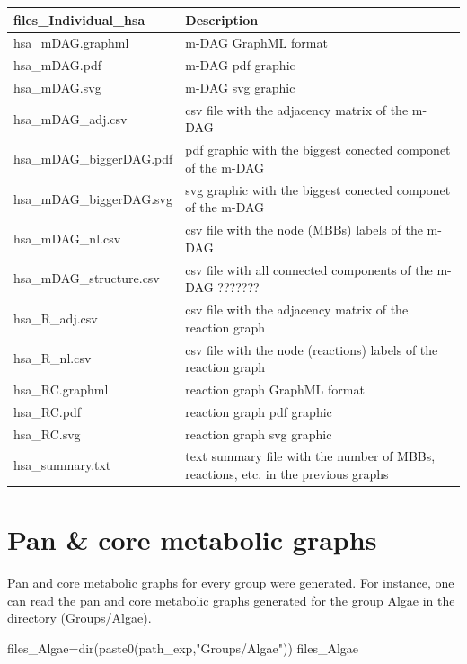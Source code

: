 \documentclass[
  letterpaper,
  DIV=11,
  numbers=noendperiod]{scrreprt}
\newenvironment{Shaded}{}{}
\newcommand{\FunctionTok}[1]{\textcolor[rgb]{0.38,0.69,0.94}{#1}}
\newcommand{\NormalTok}[1]{\textcolor[rgb]{0.67,0.70,0.75}{#1}}
\newcommand{\OtherTok}[1]{\textcolor[rgb]{0.15,0.68,0.38}{#1}}
\newcommand{\StringTok}[1]{\textcolor[rgb]{0.60,0.76,0.47}{#1}}
\begin{document}
\begin{tabular}{l|l}
\hline
files\_Individual\_hsa & Description\\
\hline
hsa\_mDAG.graphml & m-DAG GraphML format\\
\hline
hsa\_mDAG.pdf & m-DAG pdf graphic\\
\hline
hsa\_mDAG.svg & m-DAG svg graphic\\
\hline
hsa\_mDAG\_adj.csv & csv file with the adjacency matrix of the m-DAG\\
\hline
hsa\_mDAG\_biggerDAG.pdf & pdf graphic with the biggest conected componet of the m-DAG\\
\hline
hsa\_mDAG\_biggerDAG.svg & svg graphic with the biggest conected componet of the m-DAG\\
\hline
hsa\_mDAG\_nl.csv & csv file with the node (MBBs) labels  of the m-DAG\\
\hline
hsa\_mDAG\_structure.csv & csv file with all connected components of the m-DAG ???????\\
\hline
hsa\_R\_adj.csv & csv file with the  adjacency matrix of the reaction graph\\
\hline
hsa\_R\_nl.csv & csv file with the node (reactions) labels  of the reaction graph\\
\hline
hsa\_RC.graphml & reaction graph  GraphML format\\
\hline
hsa\_RC.pdf & reaction graph pdf graphic\\
\hline
hsa\_RC.svg & reaction graph svg graphic\\
\hline
hsa\_summary.txt & text summary file with the number of MBBs, reactions, etc. in the previous graphs\\
\hline
\end{tabular}

\hypertarget{pan-core-metabolic-graphs}{%
\section{Pan \& core metabolic graphs}\label{pan-core-metabolic-graphs}}

Pan and core metabolic graphs for every group were generated. For
instance, one can read the pan and core metabolic graphs generated for
the group Algae in the directory (Groups/Algae).

\begin{Shaded}
\begin{Highlighting}[]
\NormalTok{files\_Algae}\OtherTok{=}\FunctionTok{dir}\NormalTok{(}\FunctionTok{paste0}\NormalTok{(path\_exp,}\StringTok{"Groups/Algae"}\NormalTok{))}
\NormalTok{files\_Algae}
\end{Highlighting}
\end{Shaded}
\end{document}
